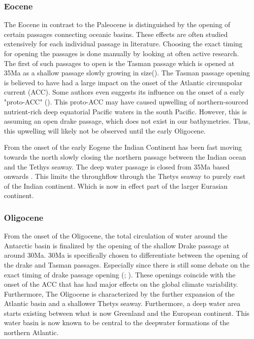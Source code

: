 \begin{multicols}{2}
\subsubsection{Eocene}
The Eocene in contrast to the Paleocene is distinguished by the opening of certain passages connecting oceanic basins. These effects are often studied extensively for each individual passage in literature. Choosing the exact timing for opening the passages is done manually by looking at often active research. The first of such passages to open is the Tasman passage which is opened at 35Ma as a shallow passage slowly growing in size(\cite{Lawver2003Sep}). The Tasman passage opening is believed to have had a large impact on the onset of the Atlantic circumpolar current (ACC). Some authors even suggests its influence on the onset of a early "proto-ACC" (\cite{Sarkar2019Jul}). This proto-ACC may have caused upwelling of northern-sourced nutrient-rich deep equatorial Pacific waters in the south Pacific. However, this is assuming an open drake passage, which does not exist in our bathymetries. Thus, this upwelling will likely not be observed until the early Oligocene. 

From the onset of the early Eogene the Indian Continent has been fast moving towards the north slowly closing the northern passage between the Indian ocean and the Tethys seaway. The deep water passage is closed from 35Ma based onwards \cite{Najman2010Dec}. This limits the throughflow through the Thetys seaway to purely east of the Indian continent. Which is now in effect part of the larger Eurasian continent. 

\subsubsection{Oligocene}
From the onset of the Oligocene, the total circulation of water around the Antarctic basin is finalized by the opening of the shallow Drake passage at around 30Ma. 30Ma is specifically chosen to differentiate between the opening of the drake and Tasman passages. Especially since there is still some debate on the exact timing of drake passage opening (\cite{Scher2006Apr}; \cite{Livermore2005Jul}). These openings coincide with the onset of the ACC that has had major effects on the global climate variability. Furthermore, The Oligocene is characterized by the further expansion of the Atlantic basin and a shallower Thetys seaway. Furthermore, a deep water area starts existing between what is now Greenland and the European continent. This water basin is now known to be central to the deepwater formations of the northern Atlantic.
\end{multicols}

